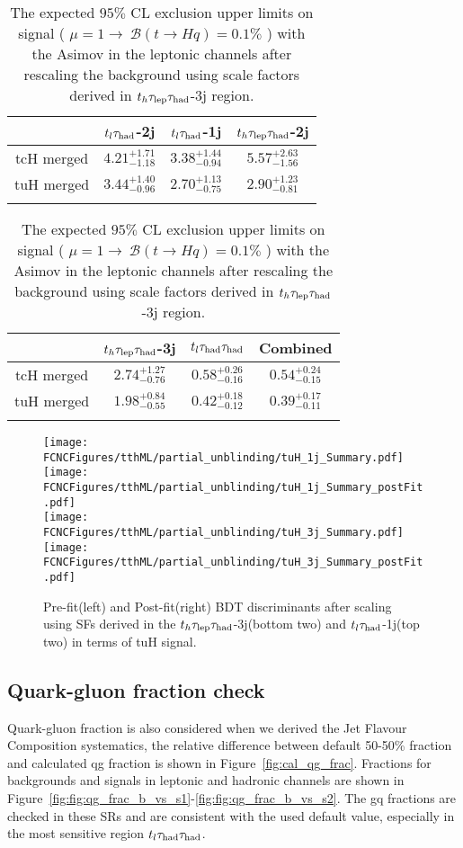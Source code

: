\begin{table}
\centering
\begin{tabular}{cccc} \toprule\toprule
 & $t_l\tau_\text{had}$-2j & $t_l\tau_\text{had}$-1j & $t_h\tau_\text{lep}{}\tau_\text{had}$-2j\\\midrule
tcH merged & $4.21^{+1.71}_{-1.18}$ & $3.38^{+1.44}_{-0.94}$ & $5.57^{+2.63}_{-1.56}$\\
tuH merged & $3.44^{+1.40}_{-0.96}$ & $2.70^{+1.13}_{-0.75}$ & $2.90^{+1.23}_{-0.81}$\\
\bottomrule\bottomrule\\
\end{tabular}
\begin{tabular}{cccc} \toprule\toprule
 & $t_h\tau_\text{lep}{}\tau_\text{had}$-3j & $t_l\tau_\text{had}{}\tau_\text{had}$ & Combined\\\midrule
tcH merged & $2.74^{+1.27}_{-0.76}$ & $0.58^{+0.26}_{-0.16}$ & $0.54^{+0.24}_{-0.15}$\\
tuH merged & $1.98^{+0.84}_{-0.55}$ & $0.42^{+0.18}_{-0.12}$ & $0.39^{+0.17}_{-0.11}$\\
\bottomrule\bottomrule\\
\end{tabular}
\caption{The expected $95\%$ CL exclusion upper limits on signal ( $\mu=1\to~\mathcal{B}(t\to Hq)=0.1\%$ ) with the Asimov in the leptonic channels after rescaling the background using scale factors derived in $t_h\tau_\text{lep}{}\tau_\text{had}$-3j region.} 
\label{tab:tthML_rescaled_limit_3j}
\end{table}

\begin{figure}[H]
\centering
\texttt{[image: \\FCNCFigures/tthML/partial\_unblinding/tuH\_1j\_Summary.pdf]}
\texttt{[image: \\FCNCFigures/tthML/partial\_unblinding/tuH\_1j\_Summary\_postFit.pdf]}
\\
\texttt{[image: \\FCNCFigures/tthML/partial\_unblinding/tuH\_3j\_Summary.pdf]}
\texttt{[image: \\FCNCFigures/tthML/partial\_unblinding/tuH\_3j\_Summary\_postFit.pdf]}
\caption{Pre-fit(left) and Post-fit(right) BDT discriminants after scaling using SFs derived in the $t_h\tau_\text{lep}{}\tau_\text{had}$-3j(bottom two) and $t_l\tau_\text{had}$-1j(top two) in terms of tuH signal. }
\label{fig:tthML_partial_unblinding_tuH}
\end{figure}


\subsection{Quark-gluon fraction check}
Quark-gluon fraction is also considered when we derived the Jet Flavour Composition systematics, the relative difference between default 50-50\% fraction and calculated qg fraction is shown in Figure~\ref{fig:cal_qg_frac}. Fractions for backgrounds and signals in leptonic and hadronic channels are shown in Figure~\ref{fig:fig:qg_frac_b_vs_s1}-\ref{fig:fig:qg_frac_b_vs_s2}. The gq fractions are checked in these SRs and are consistent with the used default value, especially in the most sensitive region $t_l\tau_\text{had}{}\tau_\text{had}$.


